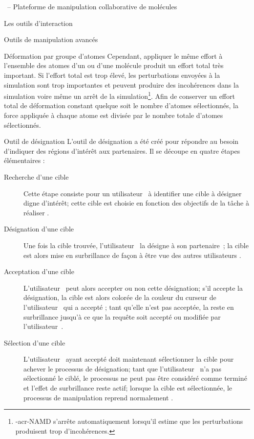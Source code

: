 \documentclass[myfrancais,ngerman,english,french]{mythesis}
\begin{document}
\begin{mychapter}{\myShaddock\ -- Plateforme de manipulation collaborative de molécules}
\begin{mysection}{Les outils d'interaction}
\begin{mysubsection}{Outils de manipulation avancés}
\begin{mysubsubsection}{Déformation par groupe d'atomes}
					Cependant, appliquer le même effort à l'ensemble des atomes d'un  ou d'une molécule produit un effort total très important.
					Si l'effort total est trop élevé, les perturbations envoyées à la simulation sont trop importantes et peuvent produire des incohérences dans la simulation voire même un arrêt de la simulation\footnote{\myacro-{acr-NAMD} s'arrête automatiquement lorsqu'il estime que les perturbations produisent trop d'incohérences.}.
					Afin de conserver un effort total de déformation constant quelque soit le nombre d'atomes sélectionnés, la force appliquée à chaque atome est divisée par le nombre totale d'atomes sélectionnés.
				\end{mysubsubsection}
				\begin{mysubsubsection}{Outil de désignation}
					L'outil de désignation a été créé pour répondre au besoin d'indiquer des régions d'intérêt aux partenaires.
					Il se découpe en quatre étapes élémentaires :
					\begin{description}
						\item[Recherche d'une cible] Cette étape consiste pour un utilisateur~ à identifier une cible à désigner digne d'intérêt;
							cette cible est choisie en fonction des objectifs de la tâche à réaliser .
						\item[Désignation d'une cible] Une fois la cible trouvée, l'utilisateur~ la désigne à son partenaire~;
							la cible est alors mise en surbrillance de façon à être vue des autres utilisateurs .
						\item[Acceptation d'une cible] L'utilisateur~ peut alors accepter ou non cette désignation;
							s'il accepte la désignation, la cible est alors colorée de la couleur du curseur de l'utilisateur~ qui a accepté ;
							tant qu'elle n'est pas acceptée, la  reste en surbrillance jusqu'à ce que la requête soit accepté ou modifiée par l'utilisateur~.
						\item[Sélection d'une cible] L'utilisateur~ ayant accepté doit maintenant sélectionner la cible pour achever le processus de désignation;
							tant que l'utilisateur~ n'a pas sélectionné le  ciblé, le processus ne peut pas être considéré comme terminé et l'effet de surbrillance reste actif;
							lorsque la cible est sélectionnée, le processus de manipulation reprend normalement .
					\end{description}


\end{mysubsubsection}
\end{mysubsection}
\end{mysection}
\end{mychapter}
\end{document}

